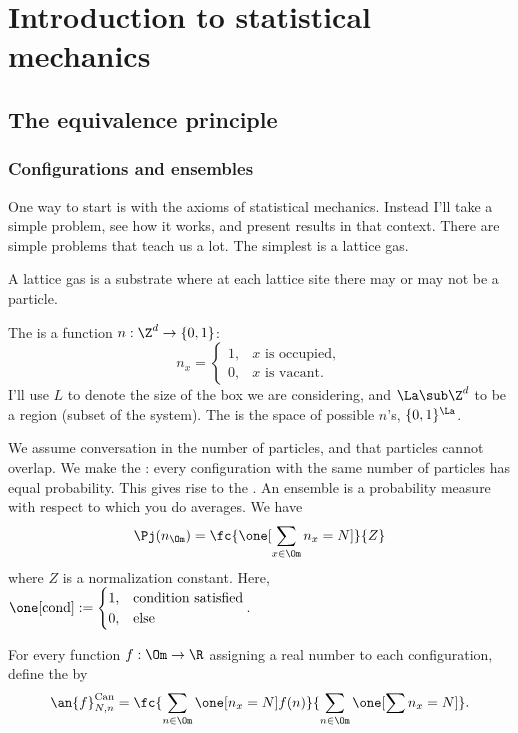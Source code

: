 \chapter{Introduction to statistical mechanics}


\section{The equivalence principle}
\subsection{Configurations and ensembles}
One way to start is with the axioms of statistical mechanics. Instead I'll take a simple problem, see how it works, and present results in that context. There are simple problems that teach us a lot. The simplest is a lattice gas.

A lattice gas is a substrate where at each lattice site there may or may not be a particle. 

The  is a function $n:\Z^d\to \{0,1\}$:
\[
n_x=\begin{cases}
1,&\text{$x$ is occupied},\\
0,&\text{$x$ is vacant}.
\end{cases}
\]
I'll use $L$ to denote the size of the box we are considering, and $\La\sub \Z^d$ to be a region (subset of the system). The  is the space of possible $n$'s, $\{0,1\}^{\La}$.

We assume conversation in the number of particles, and that particles cannot overlap. %
We make the : every configuration with the same number of particles has equal probability. This gives rise to the . An ensemble is a probability measure with respect to which you do averages. We have
\[
\Pj(n_{\Om})= \fc{\one[\sum_{x\in \Om}n_x=N]}{Z}
\]
where $Z$ is a normalization constant.
Here, $\one[\text{cond}] := \begin{cases}
1,&\text{condition satisfied}\\
0,&\text{else}
\end{cases}$.

For every function $f:\Om\to \R$ assigning a real number to each configuration, define the  by
\[
\an{f}_{N,n}^{\text{Can}} = \fc{\sum_{n\in \Om} \one[n_x=N] f(n)}{\sum_{n\in \Om} \one[\sum n_x=N]}.
\]


